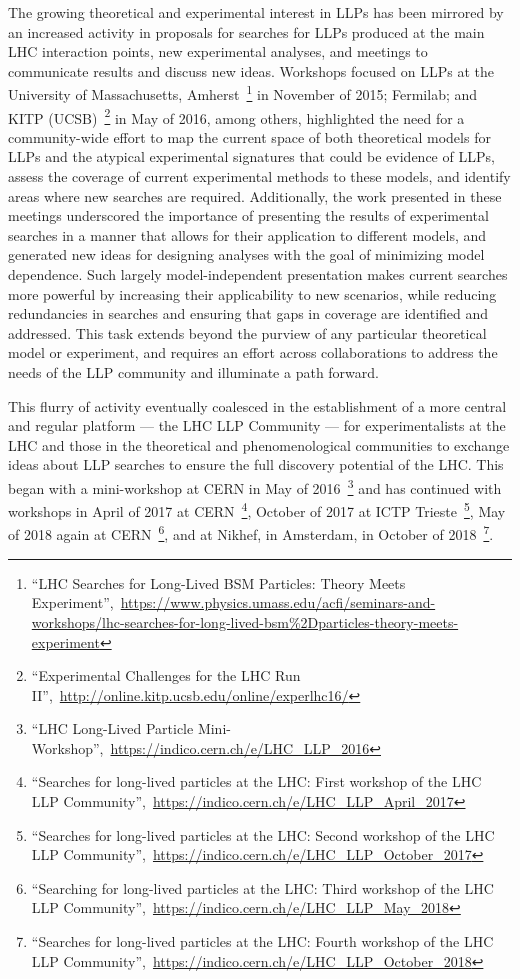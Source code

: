 The growing theoretical and experimental interest in LLPs has been mirrored by an increased activity in proposals for searches for LLPs produced at the main LHC interaction points, new experimental analyses, and meetings to communicate results and discuss new ideas.
Workshops focused on LLPs at the University of Massachusetts, Amherst~\footnote{``LHC Searches for Long-Lived BSM Particles: Theory Meets Experiment'',~\url{https://www.physics.umass.edu/acfi/seminars-and-workshops/lhc-searches-for-long-lived-bsm\%2Dparticles-theory-meets-experiment}} in November of 2015; Fermilab; and KITP (UCSB)~\footnote{``Experimental Challenges for the LHC Run II'',~\url{http://online.kitp.ucsb.edu/online/experlhc16/}} in May of 2016, among others, highlighted the need for a community-wide effort to map the current space of both theoretical models for LLPs and the atypical experimental signatures that could be evidence of LLPs, assess the coverage of current experimental methods to these models, and identify areas where new searches are required.
Additionally, the work presented in these meetings underscored the importance of presenting the results of experimental searches in a manner that allows for their application to different models, and generated new ideas for designing analyses with the goal of minimizing model dependence.
Such largely model-independent presentation makes current searches more powerful by increasing their applicability to new scenarios, while reducing redundancies in searches and ensuring that gaps in coverage are identified and addressed.
This task extends beyond the purview of any particular theoretical model or experiment, and requires an effort across collaborations to address the needs of the LLP community and illuminate a path forward.

This flurry of activity eventually coalesced in the establishment of a more central and regular platform --- the LHC LLP Community --- for experimentalists at the LHC and those in the theoretical and phenomenological communities to exchange ideas about LLP searches to ensure the full discovery potential of the LHC.
This began with a mini-workshop at CERN in May of 2016~\footnote{``LHC Long-Lived Particle Mini-Workshop'',~\url{https://indico.cern.ch/e/LHC_LLP_2016}} and has continued with workshops in April of 2017 at CERN~\footnote{``Searches for long-lived particles at the LHC: First workshop of the LHC LLP Community'',~\url{https://indico.cern.ch/e/LHC_LLP_April_2017}}, October of 2017 at ICTP Trieste~\footnote{``Searches for long-lived particles at the LHC: Second workshop of the LHC LLP Community'',~\url{https://indico.cern.ch/e/LHC_LLP_October_2017}}, May of 2018 again at CERN~\footnote{``Searching for long-lived particles at the LHC: Third workshop of the LHC LLP Community'',~\url{https://indico.cern.ch/e/LHC_LLP_May_2018}}, and at Nikhef, in Amsterdam, in October of 2018~\footnote{``Searches for long-lived particles at the LHC: Fourth workshop of the LHC LLP Community'',~\url{https://indico.cern.ch/e/LHC_LLP_October_2018}}.

